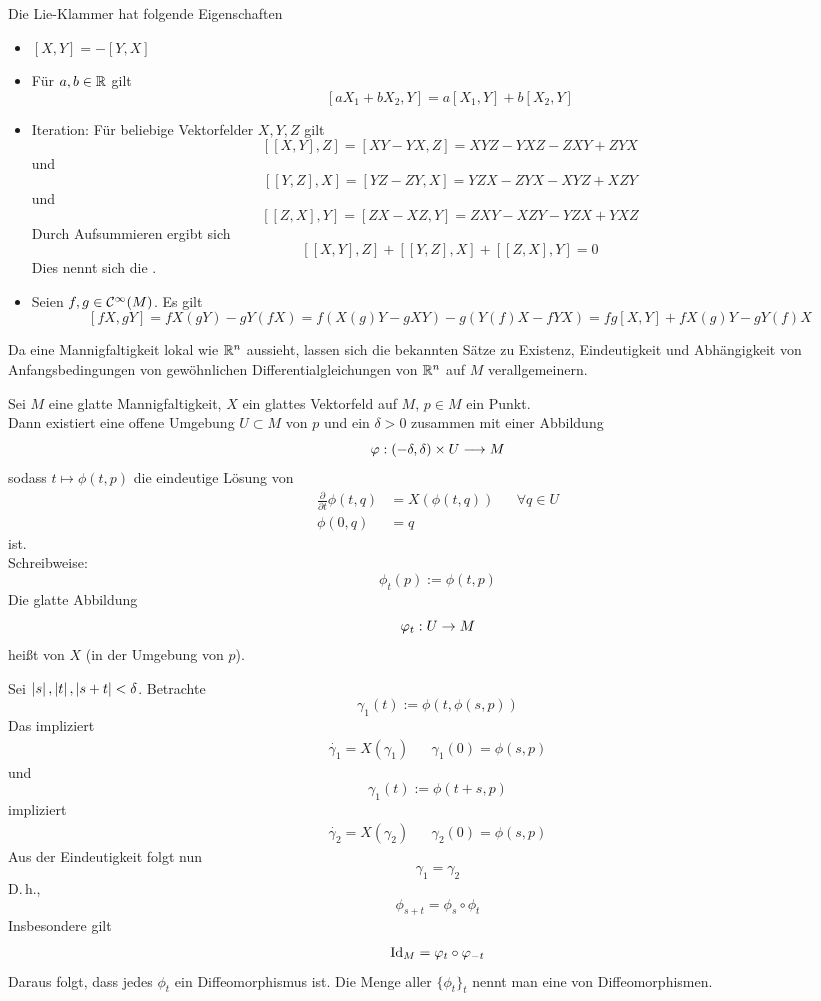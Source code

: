 \Bem{}
Die Lie-Klammer hat folgende Eigenschaften
\begin{itemize}
	\item $[X,Y] = - [Y,X]$
	\item Für $a,b \in \mathbb{R}$ gilt
	\[ [aX_1 + bX_2, Y] = a[X_1, Y] + b[X_2, Y] \]
	\item Iteration: Für beliebige Vektorfelder $X,Y,Z$ gilt
	\[ [[X,Y], Z] = [ XY - YX, Z ] = XYZ- YXZ - ZXY + ZYX \]
	und
	\[ [[Y,Z], X] = [ YZ - ZY, X ] = YZX- ZYX - XYZ + XZY \]
	und
	\[ [[Z,X], Y] = [ ZX - XZ, Y ] = ZXY - XZY - YZX + YXZ \]
	Durch Aufsummieren ergibt sich
	\[ [[X,Y], Z] + [[Y,Z], X]  + [[Z,X], Y] = 0\]
	Dies nennt sich die .
	\item Seien $f,g \in \mathcal{C}^{\infty}(M)$. Es gilt
	\[ [fX, gY] = fX(gY) - gY(fX) = f(X(g)Y - gXY) - g(Y(f)X - fYX) = fg[X,Y] + fX(g) Y - gY(f)X \]
\end{itemize}

\newcommand{\pf}[2]{\frac{\partial #1}{\partial #2}}
Da eine Mannigfaltigkeit lokal wie $\mathbb{R}^n$ aussieht, lassen sich die bekannten Sätze zu Existenz, Eindeutigkeit und Abhängigkeit von Anfangsbedingungen von gewöhnlichen Differentialgleichungen von $\mathbb{R}^n$ auf $M$ verallgemeinern.

\Satz{}
Sei $M$ eine glatte Mannigfaltigkeit, $X$ ein glattes Vektorfeld auf $M$, $p \in M$ ein Punkt.\\
Dann existiert eine offene Umgebung $U \subset M$ von $p$ und ein $\delta > 0$ zusammen mit einer Abbildung
\[ \varphi : (-\delta, \delta) \times U \overset{}{\longrightarrow} M \]
sodass $t \mapsto \phi(t,p)$ die eindeutige Lösung von
\begin{align*}
\pf{}{t} \phi(t,q) &= X(\phi(t,q)) && \forall q \in U\\
\phi(0,q) &= q
\end{align*}
ist.\\
Schreibweise:
\[ \phi_t(p) := \phi(t,p) \]
Die glatte Abbildung
\[ \varphi_t : U\overset{}{\rightarrow} M \]
heißt  von $X$ (in der Umgebung von $p$).

\Bem{}
Sei $\left|s\right|, \left|t\right|, \left|s+t\right| < \delta$. Betrachte
\[ \gamma_1(t) := \phi(t, \phi(s,p)) \]
Das impliziert
\begin{align*}
\dot{\gamma_1} = X(\gamma_1) && \gamma_1(0) = \phi(s,p)
\end{align*}
und
\[ \gamma_1(t) := \phi(t+s, p) \]
impliziert
\begin{align*}
\dot{\gamma_2} = X(\gamma_2) && \gamma_2(0) = \phi(s,p)
\end{align*}
Aus der Eindeutigkeit folgt nun
\[ \gamma_1 = \gamma_2 \]
D.\,h.,
\[ \phi_{s+t} = \phi_s \circ \phi_t \]
Insbesondere gilt
\[ \text{Id}_{M} = \varphi_t\circ \varphi_{-t} \]
Daraus folgt, dass jedes $\phi_t$ ein Diffeomorphismus ist. Die Menge aller $\{\phi_t\}_{t}$ nennt man eine  von Diffeomorphismen.

